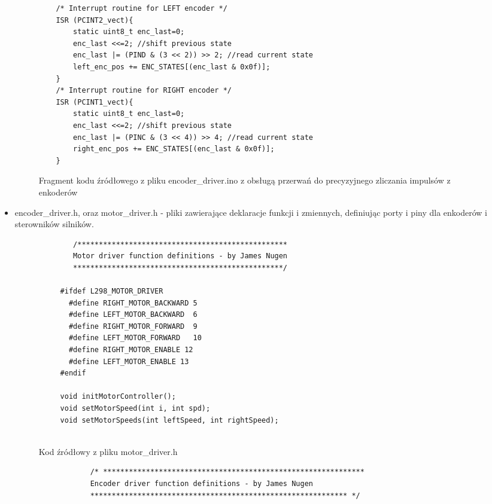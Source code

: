 \documentclass[a4paper,twoside,12pt]{book}
\begin{document}
\begin{itemize}
	\begin{figure}[!hb]
		\centering
	\begin{lstlisting}
	/* Interrupt routine for LEFT encoder */
	ISR (PCINT2_vect){
		static uint8_t enc_last=0;	
		enc_last <<=2; //shift previous state
		enc_last |= (PIND & (3 << 2)) >> 2; //read current state
		left_enc_pos += ENC_STATES[(enc_last & 0x0f)];
	}
	/* Interrupt routine for RIGHT encoder */
	ISR (PCINT1_vect){
		static uint8_t enc_last=0;
		enc_last <<=2; //shift previous state
		enc_last |= (PINC & (3 << 4)) >> 4; //read current state
		right_enc_pos += ENC_STATES[(enc_last & 0x0f)];
	}
	\end{lstlisting}
	\caption{Fragment kodu źródłowego z pliku encoder\_driver.ino z obsługą przerwań do precyzyjnego zliczania impulsów z enkoderów}
	\label{fig:encoder-driver2}
	\end{figure}
\newpage
	\item encoder\_driver.h, oraz motor\_driver.h - pliki zawierające deklaracje funkcji i zmiennych, definiując porty i piny dla enkoderów i sterowników silników. 
	\newline

	
	\begin{figure}[!hb]
		\centering
	\begin{lstlisting}
		/*************************************************
		Motor driver function definitions - by James Nugen
		*************************************************/
	 
	 #ifdef L298_MOTOR_DRIVER
	   #define RIGHT_MOTOR_BACKWARD 5
	   #define LEFT_MOTOR_BACKWARD  6
	   #define RIGHT_MOTOR_FORWARD  9
	   #define LEFT_MOTOR_FORWARD   10
	   #define RIGHT_MOTOR_ENABLE 12
	   #define LEFT_MOTOR_ENABLE 13
	 #endif
	 
	 void initMotorController();
	 void setMotorSpeed(int i, int spd);
	 void setMotorSpeeds(int leftSpeed, int rightSpeed);
	 
		\end{lstlisting}
		\caption{Kod źródłowy z pliku motor\_driver.h}
		\label{fig:motor-driver}
		\end{figure}

	

	\begin{figure}[!hb]
		\begin{lstlisting}
			/* *************************************************************
			Encoder driver function definitions - by James Nugen
			************************************************************ */
			

\end{lstlisting}
\end{figure}
\end{itemize}
\end{document}

